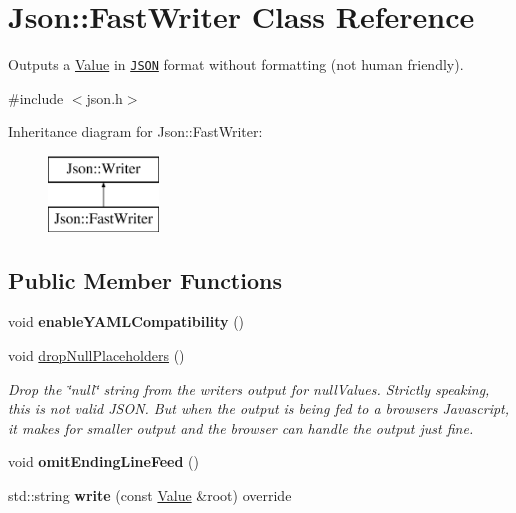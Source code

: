 \hypertarget{class_json_1_1_fast_writer}{}\section{Json\+:\+:Fast\+Writer Class Reference}
\label{class_json_1_1_fast_writer}


Outputs a \hyperlink{class_json_1_1_value}{Value} in \href{http://www.json.org}{\tt J\+S\+ON} format without formatting (not human friendly).  




{\ttfamily \#include $<$json.\+h$>$}

Inheritance diagram for Json\+:\+:Fast\+Writer\+:\begin{figure}[H]
\begin{center}
\leavevmode
\includegraphics[height=2.000000cm]{class_json_1_1_fast_writer}
\end{center}
\end{figure}
\subsection*{Public Member Functions}
\begin{DoxyCompactItemize}
\item 
void {\bfseries enable\+Y\+A\+M\+L\+Compatibility} ()\hypertarget{class_json_1_1_fast_writer_a78d98e9f76d33660ad6e6a1abe287d45}{}\label{class_json_1_1_fast_writer_a78d98e9f76d33660ad6e6a1abe287d45}

\item 
void \hyperlink{class_json_1_1_fast_writer_a6e93d8dce951e408517311026a065b40}{drop\+Null\+Placeholders} ()\hypertarget{class_json_1_1_fast_writer_a6e93d8dce951e408517311026a065b40}{}\label{class_json_1_1_fast_writer_a6e93d8dce951e408517311026a065b40}

\begin{DoxyCompactList}\small\item\em Drop the \char`\"{}null\char`\"{} string from the writer\textquotesingle{}s output for null\+Values. Strictly speaking, this is not valid J\+S\+ON. But when the output is being fed to a browser\textquotesingle{}s Javascript, it makes for smaller output and the browser can handle the output just fine. \end{DoxyCompactList}\item 
void {\bfseries omit\+Ending\+Line\+Feed} ()\hypertarget{class_json_1_1_fast_writer_af4ee077d365d75941fb2688d97207a55}{}\label{class_json_1_1_fast_writer_af4ee077d365d75941fb2688d97207a55}

\item 
std\+::string {\bfseries write} (const \hyperlink{class_json_1_1_value}{Value} \&root) override\hypertarget{class_json_1_1_fast_writer_aee69e3f778982ec9218c1a5a7c6a3e7a}{}\label{class_json_1_1_fast_writer_aee69e3f778982ec9218c1a5a7c6a3e7a}

\end{DoxyCompactItemize}


